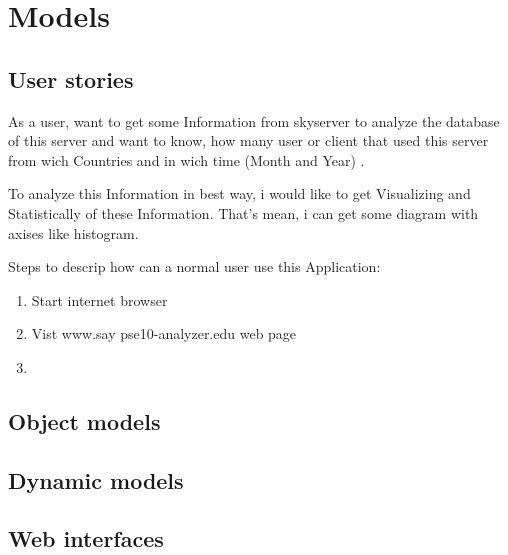 \section{Models}

\subsection{User stories}

As a user, want to get some Information from skyserver to analyze the database of this server and want to know, how many 
user or client that used this server from wich Countries and in wich time (Month and Year) . 

To analyze this Information in best way, i would like to get Visualizing and Statistically of these Information.
That's mean, i can get some diagram with axises like histogram.

Steps to descrip how can a normal user use this Application:

\renewcommand{\theenumi}{\arabic{enumi}}
\renewcommand{\labelenumi}{\theenumi}

\begin{enumerate}

\item Start internet browser

\item Vist www.say pse10-analyzer.edu web page

\item 

\end{enumerate}

\subsection{Object models}

\subsection{Dynamic models}

\subsection{Web interfaces}

\newpage
